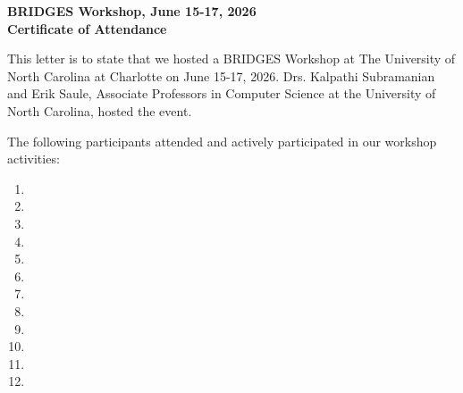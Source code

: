 \documentclass[10pt]{article}
\begin{document}
\vspace*{-0.5in}
\unccletterhead
\begin{center}
\large \textbf{BRIDGES Workshop, June 15-17, 2026 \\
		Certificate of Attendance}
\end{center}
\laddr
{}
This letter is to state that we hosted a BRIDGES Workshop at The University
of North Carolina at Charlotte on June 15-17, 2026. Drs. Kalpathi Subramanian 
and Erik Saule, Associate Professors in Computer Science at the University
of North Carolina, hosted the event. 

The following participants attended  
and actively participated in our workshop activities:
\begin{enumerate}
\setlength{\itemsep}{0em}
\item 
\item 
\item
\item 
\item 
\item 
\item 
\item 
\item 
\item
\item 
\item 
\end{enumerate}
%
%
\vspace*{-0.2in}
\end{document}
